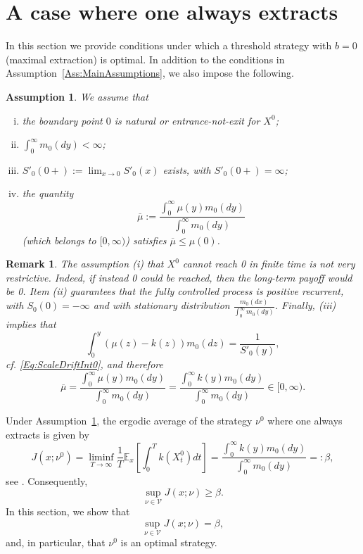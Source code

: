 \documentclass[12pt]{article}
\newtheorem{assumption}[theorem]{Assumption}
\newtheorem{remark}[theorem]{Remark}
\begin{document}
\section{A case where one always extracts}
\label{b=0}

In this section we provide conditions under which a threshold strategy with $b=0$ (maximal extraction) is optimal.
In addition to the conditions in Assumption~\ref{Ass:MainAssumptions}, we also impose the following.

\begin{assumption}\label{not hit 0}
    We assume that
    \begin{enumerate}[(i)]
        \item the boundary point $0$ is natural or entrance-not-exit for $X^0$; 
        \item $\int_0^\infty m_0(dy)<\infty $;
        \item $S'_0(0+):=\lim_{x\to 0}S'_0(x)$ exists, with $S'_0(0+)=\infty$;
        \item the quantity \[\overline\mu:=\frac{\int_0^{\infty}\mu(y)m_0(dy)}{\int_0^\infty m_0(dy)}\]
        (which belongs to $[0,\infty)$) satisfies $\overline\mu\leq\mu(0)$.
    \end{enumerate}
\end{assumption}

 \begin{remark}
The assumption (i) that $X^0$ cannot reach 0 in finite time is not very restrictive. Indeed, if instead 0 could be reached, then the long-term payoff would be 0.
Item (ii) guarantees that the fully controlled process is positive recurrent, with $S_0(0)=-\infty$ and with stationary distribution $\frac{m_0(dx)}{\int_0^\infty m_0(dy)}$. 
Finally, (iii) implies that 
 \begin{equation}\label{not hit 00}
 \int_0^y (\mu(z)-k(z)) m_0(dz) = \frac{1}{S'_0(y)},
 \end{equation}
 cf. \eqref{Eq:ScaleDriftInt0}, and therefore 
 \begin{equation}\label{overline mu}
 \overline\mu=\frac{\int_0^{\infty}\mu(y)m_0(dy)}{\int_0^\infty m_0(dy)}=\frac{\int_0^{\infty}k(y)m_0(dy)}{\int_0^\infty m_0(dy)}\in [0,\infty).
 \end{equation}
\end{remark}


Under Assumption~\ref{not hit 0}, the ergodic average of the strategy $\nu^0$ where one always extracts is given by 
\begin{equation}\label{beta*}
 J(x;\nu^0)=\liminf_{T\to \infty}\frac{1}{T}\mathbb{E}_x\left[\int_0^T k(X^0_t) dt \right] = \frac{\int_0^\infty k(y) m_0(dy)}{\int_0^\infty m_0(dy)}=:\beta, 
\end{equation}
see \cite[p. 37]{BorodinSalminen}.
Consequently, 
\[\sup_{\nu \in \mathcal{V}} J(x;\nu) \geq \beta.
\]
In this section, we show that 
\[\sup_{\nu \in \mathcal{V}} J(x;\nu) = \beta,\]
and, in particular, that $\nu^0$ is an optimal strategy.
\end{document}
